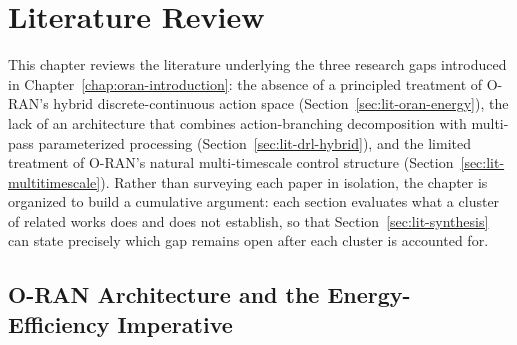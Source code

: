 %
%

\chapter{Literature Review}
\label{chap:oran-literature}

This chapter reviews the literature underlying the three research gaps
introduced in Chapter~\ref{chap:oran-introduction}: the absence of a
principled treatment of O-RAN's hybrid discrete-continuous action space
(Section~\ref{sec:lit-oran-energy}), the lack of an architecture that
combines action-branching decomposition with multi-pass parameterized
processing (Section~\ref{sec:lit-drl-hybrid}), and the limited treatment of
O-RAN's natural multi-timescale control structure
(Section~\ref{sec:lit-multitimescale}). Rather than surveying each paper in
isolation, the chapter is organized to build a cumulative argument: each
section evaluates what a cluster of related works does and does not
establish, so that Section~\ref{sec:lit-synthesis} can state precisely which
gap remains open after each cluster is accounted for.

\section{O-RAN Architecture and the Energy-Efficiency Imperative}
\label{sec:oran-arch-review}

